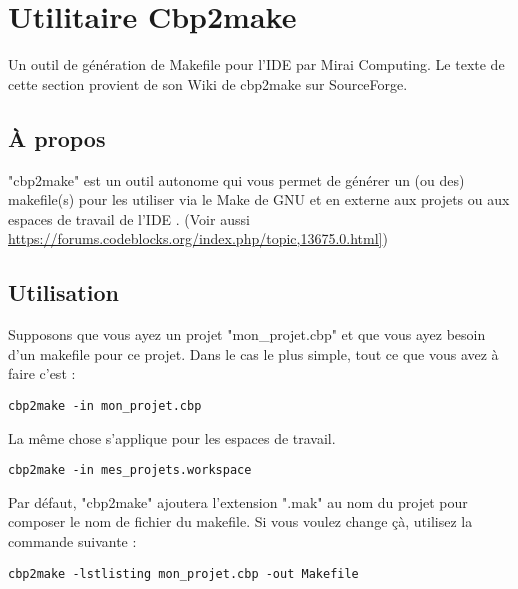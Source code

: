 ﻿\section{Utilitaire Cbp2make}\label{sec:cbp2make}

Un outil de génération de Makefile pour l'IDE \codeblocks par Mirai Computing. Le texte de cette section provient de son Wiki de cbp2make sur SourceForge.

\subsection{À propos}

"cbp2make" est un outil autonome qui vous permet de générer un (ou des) makefile(s) pour les utiliser via le Make de GNU et en externe aux projets ou aux espaces de travail de l'IDE \codeblocks. (Voir aussi \url{https://forums.codeblocks.org/index.php/topic,13675.0.html]})

\subsection{Utilisation}

Supposons que vous ayez un projet "mon\_projet.cbp" et que vous ayez besoin d'un makefile pour ce projet. Dans le cas le plus simple, tout ce que vous avez à faire c'est :
\begin{lstlisting}
cbp2make -in mon_projet.cbp
\end{lstlisting}

La même chose s'applique pour les espaces de travail.
\begin{lstlisting}
cbp2make -in mes_projets.workspace
\end{lstlisting}

Par défaut, "cbp2make" ajoutera l'extension ".mak" au nom du projet pour composer le nom de fichier du makefile.
Si vous voulez change çà, utilisez la commande suivante :

\begin{lstlisting}
cbp2make -lstlisting mon_projet.cbp -out Makefile
\end{lstlisting}


